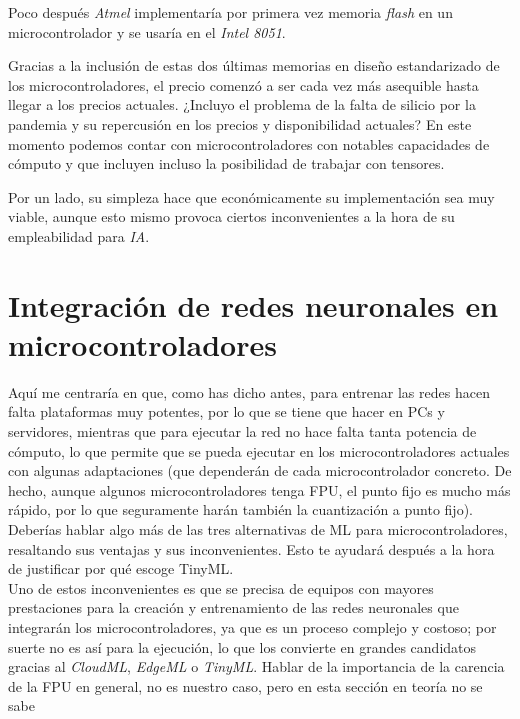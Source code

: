 Poco después \textit{Atmel} implementaría por primera vez memoria \textit{flash}
en un microcontrolador y se usaría en el \textit{Intel 8051}.

Gracias a la inclusión de estas dos últimas memorias en diseño estandarizado de
los microcontroladores, el precio comenzó a ser cada vez más asequible hasta
llegar a los precios actuales. {\color{green}¿Incluyo el problema de la falta
de silicio por la pandemia y su repercusión en los precios y disponibilidad actuales?}
En este momento podemos contar con microcontroladores con notables capacidades
de cómputo y que incluyen incluso la posibilidad de trabajar con tensores. 

Por un lado, su simpleza hace que económicamente su implementación sea muy
viable, aunque esto mismo provoca ciertos inconvenientes a la hora de su
empleabilidad para \textit{IA}.


\section{Integración de redes neuronales en microcontroladores}
{\color{red}Aquí me
centraría en que, como has dicho antes, para entrenar las redes hacen
falta plataformas muy potentes, por lo que se tiene que hacer en PCs y
servidores, mientras que para ejecutar la red no hace falta tanta
potencia de cómputo, lo que permite que se pueda ejecutar en los
microcontroladores actuales con algunas adaptaciones (que dependerán
de cada microcontrolador concreto. De hecho, aunque algunos microcontroladores tenga FPU, el punto fijo es mucho más rápido, por
lo que seguramente harán también la cuantización a punto fijo). }\\

{\color{red}Deberías hablar algo más de las tres alternativas de ML para
microcontroladores, resaltando sus ventajas y sus inconvenientes. Esto
te ayudará después a la hora de justificar por qué escoge TinyML.}\\

Uno de estos inconvenientes es que se precisa de equipos con mayores prestaciones para la
creación y entrenamiento de las redes neuronales que integrarán los microcontroladores,
ya que es un proceso complejo y costoso;
por suerte no es así para la ejecución, lo que los convierte en grandes candidatos
gracias al \textit{CloudML}, \textit{EdgeML} o \textit{TinyML}.
{\color{red}Hablar de la importancia de la carencia de la FPU en general, no es
nuestro caso, pero en esta sección en teoría no se sabe}


